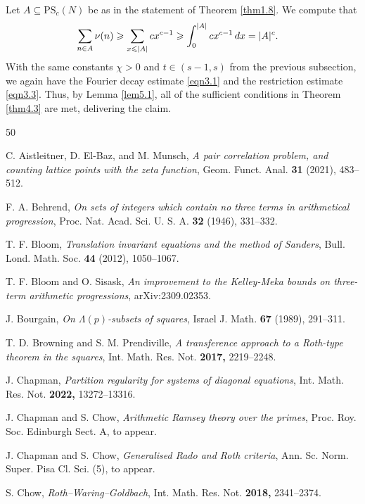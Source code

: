 \documentclass[12pt, reqno]{amsart}
\theoremstyle{definition}
\theoremstyle{remark}
\numberwithin{equation}{section}
\theoremstyle{definition}
\def\le{\leqslant} \def\ge{\geqslant} \def\pleq{\preccurlyeq} \def\ple{\prec}
\def\d{{\,{\rm d}}}
\def \PS {\mathrm{PS}}
\begin{document}
Let $A\subseteq\PS_c(N)$ be as in the statement of Theorem \ref{thm1.8}. 
We compute that
\begin{align*}
\sum_{n \in A} \nu(n) & \ge \sum_{x \le |A|} cx^{c-1} \geqslant \int_{0}^{|A|}cx^{c-1}\d x = |A|^c.
\end{align*}
With the same constants $\chi > 0$ and $t \in (s-1, s)$ from the previous subsection, we again have the Fourier decay estimate \eqref{eqn3.1} and the restriction estimate \eqref{eqn3.3}. Thus, by Lemma \ref{lem5.1},
all of the sufficient conditions in Theorem \ref{thm4.3} are met, delivering the claim. 

\providecommand{\bysame}{\leavevmode\hbox to3em{\hrulefill}\thinspace}
\begin{thebibliography}{50}

C. Aistleitner, D. El-Baz, and M. Munsch, \emph{A pair correlation problem, and counting lattice points with the zeta function}, Geom. Funct. Anal. \textbf{31} (2021), 483--512.

F. A. Behrend, \emph{On sets of integers which contain no three terms in arithmetical progression},
Proc. Nat. Acad. Sci. U. S. A. \textbf{32} (1946), 331--332.

T. F. Bloom, \emph{Translation invariant equations and the method of Sanders},
Bull. Lond. Math. Soc. \textbf{44} (2012), 1050--1067.

T. F. Bloom and O. Sisask, \emph{An improvement to the Kelley-Meka bounds on three-term arithmetic progressions}, arXiv:2309.02353.

J. Bourgain, \emph{On $\Lambda(p)$-subsets of squares}, Israel J. Math. \textbf{67} (1989), 291--311.

T. D. Browning and S. M. Prendiville, \emph{A transference approach to a Roth-type theorem in the squares}, Int. Math. Res. Not. \textbf{2017,} 2219--2248.

J. Chapman, \emph{Partition regularity for systems of diagonal equations}, Int. Math. Res. Not. \textbf{2022,} 
13272--13316.

J. Chapman and S. Chow, \emph{Arithmetic Ramsey theory over the primes}, Proc. Roy. Soc. Edinburgh Sect. A, to appear.

J. Chapman and S. Chow, \emph{Generalised Rado and Roth criteria}, Ann. Sc. Norm. Super. Pisa Cl. Sci. (5), to appear.

S. Chow, \emph{Roth--Waring--Goldbach}, Int. Math. Res. Not. \textbf{2018,} 2341--2374.


\end{thebibliography}
\end{document}
